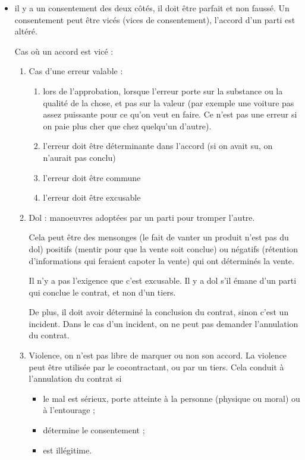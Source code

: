 		\begin{itemize}
			\item il y a un consentement des deux côtés, il doit être parfait et non faussé. Un consentement peut être vicés (vices de consentement), l'accord d'un parti est altéré. 
			
			Cas où un accord est vicé :
			
			\begin{enumerate}
				\item Cas d'une erreur valable :
			
				\begin{enumerate}
					\item lors de l'approbation, lorsque l'erreur porte sur la substance ou la qualité de la chose, et pas sur la valeur (par exemple une voiture pas assez puissante pour ce qu'on veut en faire. Ce n'est pas une erreur si on paie plus cher que chez quelqu'un d'autre).
					\item l'erreur doit être déterminante dans l'accord (si on avait su, on n'aurait pas conclu)
					\item l'erreur doit être commune
					\item l'erreur doit être excusable
				\end{enumerate}
			
				\item Dol : manoeuvres adoptées par un parti pour tromper l'autre. 
				
				Cela peut être des mensonges (le fait de vanter un produit n'est pas du dol) positifs (mentir pour que la vente soit conclue) ou négatifs (rétention d'informations qui feraient capoter la vente) qui ont déterminés la vente. 
				
				Il n'y a pas l'exigence que c'est excusable. Il y a dol s'il émane d'un parti qui conclue le contrat, et non d'un tiers. 
				
				De plus, il doit avoir déterminé la conclusion du contrat, sinon c'est un incident. Dans le cas d'un incident, on ne peut pas demander l'annulation du contrat.
								
				\item Violence, on n'est pas libre de marquer ou non son accord. La violence peut être utilisée par le cocontractant, ou par un tiers. Cela conduit à l'annulation du contrat si 
				\begin{itemize}
					\item le mal est sérieux, porte atteinte à la personne (physique ou moral) ou à l'entourage ;
					\item détermine le consentement ;
					\item est illégitime. 
				\end{itemize}
				

\end{enumerate}
\end{itemize}
